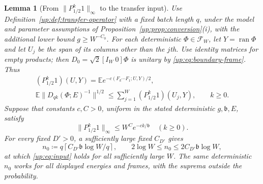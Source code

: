 \documentclass[11pt]{article}
\numberwithin{equation}{section}
\newtheorem{lemma}[theorem]{Lemma}
\theoremstyle{remark}
\newcommand{\E}{\mathbb E}
\newcommand{\ran}{\operatorname{ran}}
\begin{document}
\begin{lemma}[From $\|P_{1/2}^k1\|_\infty$ to the transfer input]
\label{up:lem:operator-reduction}
Use Definition~\ref{up:def:transfer-operator} with a fixed batch length
$q$, under the model and parameter assumptions of
Proposition~\ref{up:prop:conversion}\textup{(i)}, with the additional lower bound
$g\ge W^{-C_0}$. For each deterministic $\Phi\in\mathcal F_W$,
let $Y=\ran\Phi$ and let
$U_j$ be the span of its columns other than the $j$th.
Use identity matrices for empty products; then
$D_0=\sqrt2[I_W\ 0]\Phi$ is unitary by \eqref{up:eq:boundary-frame}.
Thus
\begin{equation}\label{cc:eq:iterate}
 \begin{gathered}
 (P_{1/2}^k1)(U,Y)=\E e^{-c(F_k\cdots F_1;U,Y)/2},\\
 \E\|D_{qk}(\Phi;E)^{-1}\|^{1/2}
 \le\sum_{j=1}^W(P_{1/2}^k1)(U_j,Y),\qquad k\ge0.
 \end{gathered}
\end{equation}
Suppose that constants $c,C>0$, uniform in the stated deterministic
$g,\mathfrak b,E$, satisfy
\begin{equation}\label{up:eq:power-input}
 \|P_{1/2}^k1\|_\infty\le W^C e^{-ck/\mathfrak b}\quad(k\ge0).
\end{equation}
For every fixed $D'>0$, a sufficiently large fixed $C_{D'}$ gives
\begin{equation}\label{up:eq:transfer-length}
 n_0\coloneqq q\left\lceil C_{D'}\mathfrak b\log W/q\right\rceil,
 \qquad 2\log W\le n_0\le 2C_{D'}\mathfrak b\log W,
\end{equation}
at which \eqref{up:eq:input} holds for all sufficiently large $W$.
The same deterministic $n_0$ works for all displayed energies and
frames, with the suprema outside the probability.
\end{lemma}
\end{document}
